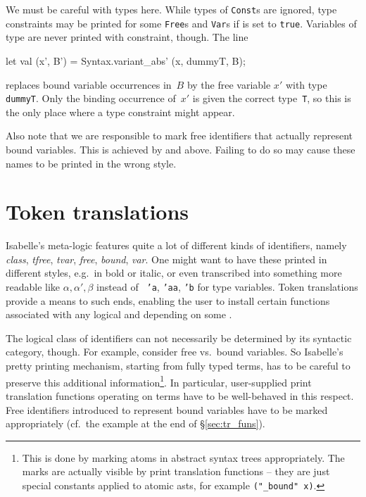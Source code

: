 We must be careful with types here.  While types of {\tt Const}s are
ignored, type constraints may be printed for some {\tt Free}s and
{\tt Var}s if  is set to {\tt true}.  Variables of type
 are never printed with constraint, though.  The line
\begin{ttbox}
        let val (x', B') = Syntax.variant_abs' (x, dummyT, B);
\end{ttbox}
replaces bound variable occurrences in~$B$ by the free variable $x'$ with
type {\tt dummyT}.  Only the binding occurrence of~$x'$ is given the
correct type~{\tt T}, so this is the only place where a type
constraint might appear.

Also note that we are responsible to mark free identifiers that
actually represent bound variables.  This is achieved by
 and  above.
Failing to do so may cause these names to be printed in the wrong
style.   


\section{Token translations} \label{sec:tok_tr}
%
Isabelle's meta-logic features quite a lot of different kinds of
identifiers, namely {\em class}, {\em tfree}, {\em tvar}, {\em free},
{\em bound}, {\em var}.  One might want to have these printed in
different styles, e.g.\ in bold or italic, or even transcribed into
something more readable like $\alpha, \alpha', \beta$ instead of {\tt
  'a}, {\tt 'aa}, {\tt 'b} for type variables.  Token translations
provide a means to such ends, enabling the user to install certain
\ML{} functions associated with any logical  and
depending on some .

The logical class of identifiers can not necessarily be determined by
its syntactic category, though.  For example, consider free vs.\ bound
variables.  So Isabelle's pretty printing mechanism, starting from
fully typed terms, has to be careful to preserve this additional
information\footnote{This is done by marking atoms in abstract syntax
  trees appropriately.  The marks are actually visible by print
  translation functions -- they are just special constants applied to
  atomic asts, for example \texttt{("_bound" x)}.}.  In particular,
user-supplied print translation functions operating on terms have to
be well-behaved in this respect.  Free identifiers introduced to
represent bound variables have to be marked appropriately (cf.\ the
example at the end of \S\ref{sec:tr_funs}).


